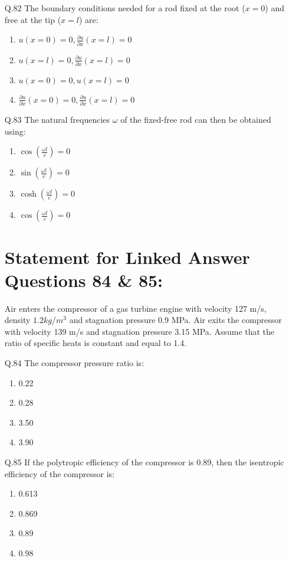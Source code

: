 \documentclass[journal]{IEEEtran}
\begin{document}
\begin{enumerate}
\item[Q.82]The boundary conditions needed for a rod fixed at the root ($x = 0$) and free at the tip ($x = l$) are:
\begin{enumerate}
    \item  $u(x=0) = 0, \frac{\partial u}{\partial x}(x = l) = 0$
    \item  $u(x=l) = 0, \frac{\partial u}{\partial x}(x = l) = 0$
    \item  $u(x=0) = 0, u(x=l) = 0$
    \item  $\frac{\partial u}{\partial x}(x=0) = 0, \frac{\partial u}{\partial x}(x=l) = 0$\\
\end{enumerate}

\item[Q.83] The natural frequencies $\omega$ of the fixed-free rod can then be obtained using:
\begin{enumerate}
    \item  $\cos \left( \frac{\omega l}{c} \right) = 0$
    \item  $\sin \left( \frac{\omega l}{c} \right) = 0$
    \item  $\cosh \left( \frac{\omega l}{c} \right) = 0$
    \item  $\cos \left( \frac{\omega l}{c} \right) = 0$\\
\end{enumerate}

\section*{Statement for Linked Answer Questions 84 \& 85:}
Air enters the compressor of a gas turbine engine with velocity 127 m/s, density $1.2 kg/m^3$ and stagnation pressure 0.9 MPa. Air exits the compressor with velocity 139 m/s and stagnation pressure 3.15 MPa. Assume that the ratio of specific heats is constant and equal to 1.4.\\

\item[Q.84] The compressor pressure ratio is:
\begin{enumerate}
    \item  0.22
    \item  0.28
    \item  3.50
    \item  3.90\\
\end{enumerate}

\item[Q.85] If the polytropic efficiency of the compressor is 0.89, then the isentropic efficiency of the compressor is:
\begin{enumerate}
    \item  0.613
    \item  0.869
    \item  0.89
    \item  0.98\\
\end{enumerate}

\end{enumerate}
\end{document}
